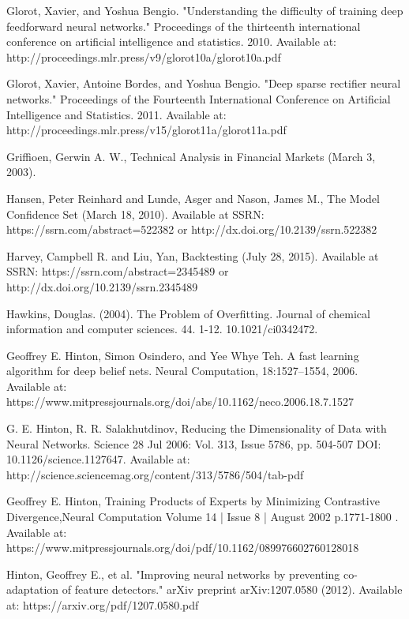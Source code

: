 \documentclass[a4paper,latin]{paper}
\begin{document}
\begin{thebibliography}{bibliography}
Glorot, Xavier, and Yoshua Bengio. "Understanding the difficulty of training deep feedforward neural networks." Proceedings of the thirteenth international conference on artificial intelligence and statistics. 2010.
Available at: http://proceedings.mlr.press/v9/glorot10a/glorot10a.pdf

Glorot, Xavier, Antoine Bordes, and Yoshua Bengio. "Deep sparse rectifier neural networks." Proceedings of the Fourteenth International Conference on Artificial Intelligence and Statistics. 2011.
Available at: http://proceedings.mlr.press/v15/glorot11a/glorot11a.pdf 

Griffioen, Gerwin A. W., Technical Analysis in Financial Markets (March 3, 2003).

Hansen, Peter Reinhard and Lunde, Asger and Nason, James M., The Model Confidence Set (March 18, 2010). Available at SSRN: https://ssrn.com/abstract=522382 or http://dx.doi.org/10.2139/ssrn.522382

Harvey, Campbell R. and Liu, Yan, Backtesting (July 28, 2015). Available at SSRN: https://ssrn.com/abstract=2345489 or http://dx.doi.org/10.2139/ssrn.2345489

Hawkins, Douglas. (2004). The Problem of Overfitting. Journal of chemical information and computer sciences. 44. 1-12. 10.1021/ci0342472. 

Geoffrey E. Hinton, Simon Osindero, and Yee Whye Teh. A fast learning algorithm for deep belief nets. Neural Computation, 18:1527–1554, 2006. 
Available at: https://www.mitpressjournals.org/doi/abs/10.1162/neco.2006.18.7.1527

G. E. Hinton, R. R. Salakhutdinov, Reducing the Dimensionality of Data with Neural 
Networks. Science  28 Jul 2006: Vol. 313, Issue 5786, pp. 504-507 DOI: 
10.1126/science.1127647. Available at: http://science.sciencemag.org/content/313/5786/504/tab-pdf

Geoffrey E. Hinton, Training Products of Experts by Minimizing Contrastive Divergence,Neural Computation
Volume 14 | Issue 8 | August 2002  p.1771-1800 . Available at: https://www.mitpressjournals.org/doi/pdf/10.1162/089976602760128018

Hinton, Geoffrey E., et al. "Improving neural networks by preventing co-adaptation of feature detectors." arXiv preprint arXiv:1207.0580 (2012).
Available at: https://arxiv.org/pdf/1207.0580.pdf


\end{thebibliography}
\end{document}
